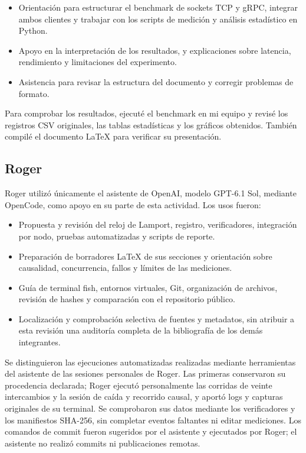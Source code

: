 \begin{itemize}
    \item Orientación para estructurar el benchmark de sockets TCP y gRPC, integrar ambos clientes y trabajar con los scripts de medición y análisis estadístico en Python.

    \item Apoyo en la interpretación de los resultados, y explicaciones sobre latencia, rendimiento y limitaciones del experimento.

    \item Asistencia para revisar la estructura del documento y corregir problemas de formato.
\end{itemize}

Para comprobar los resultados, ejecuté el benchmark en mi equipo y revisé los registros CSV originales, las tablas estadísticas y los gráficos obtenidos. También compilé el documento LaTeX para verificar su presentación.

\subsection*{Roger}
Roger utilizó únicamente el asistente de OpenAI, modelo GPT-6.1 Sol, mediante
OpenCode, como apoyo en su parte de esta actividad. Los usos fueron:
\begin{itemize}
  \item Propuesta y revisión del reloj de Lamport, registro, verificadores,
  integración por nodo, pruebas automatizadas y scripts de reporte.
  \item Preparación de borradores LaTeX de sus secciones y orientación sobre
  causalidad, concurrencia, fallos y límites de las mediciones.
  \item Guía de terminal fish, entornos virtuales, Git, organización de archivos,
  revisión de hashes y comparación con el repositorio público.
  \item Localización y comprobación selectiva de fuentes y metadatos, sin atribuir
  a esta revisión una auditoría completa de la bibliografía de los demás integrantes.
\end{itemize}

Se distinguieron las ejecuciones automatizadas realizadas mediante herramientas
del asistente de las sesiones personales de Roger. Las primeras conservaron su
procedencia declarada; Roger ejecutó personalmente las corridas de veinte
intercambios y la sesión de caída y recorrido causal, y aportó logs y capturas
originales de su terminal. Se comprobaron sus datos mediante los verificadores
y los manifiestos SHA-256, sin completar eventos faltantes ni editar mediciones.
Los comandos de commit fueron sugeridos por el asistente y ejecutados por Roger;
el asistente no realizó commits ni publicaciones remotas.

